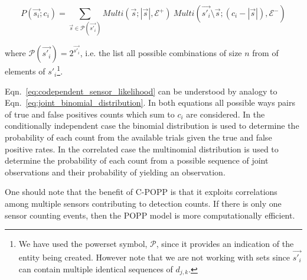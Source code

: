 \begin{equation}
\label{eq:codependent_sensor_likelihood}
P(\vec{s_i} ; c_i) = \sum\limits_{\vec{s} \in \mathcal{P}(\vec{s'_i})} Multi(\vec{s} ; |\vec{s}|, \mathcal E^+) ~ Multi(\vec{s'_i}\setminus \vec{s} ; (c_i - |\vec{s}|), \mathcal E^-)
\end{equation}

\noindent where $\mathcal{P}(\vec{s'_i}) = 2^{\vec{s'_i}}$, i.e. the list all possible combinations of size $n$ from of elements of $s'_i$\footnote{We have used the powerset symbol, $\mathcal{P}$, since it provides an indication of the entity being created. However note that we are not working with sets since $\vec{s'_i}$ can contain multiple identical sequences of $d_{j,k}$.}. 


Eqn.~\ref{eq:codependent_sensor_likelihood} can be understood by analogy to Eqn.~\ref{eq:joint_binomial_distribution}. In both equations all possible ways pairs of true and false positives counts which sum to $c_i$ are considered. In the conditionally independent case the binomial distribution is used to determine the probability of each count from the available trials given the true and false positive rates. In the correlated case the multinomial distribution is used to determine the probability of each count from a possible sequence of joint observations and their probability of yielding an observation.

One should note that the benefit of C-POPP is that it exploits correlations among multiple sensors contributing to detection counts. If there is only one sensor counting events, then the POPP model is more computationally efficient.
